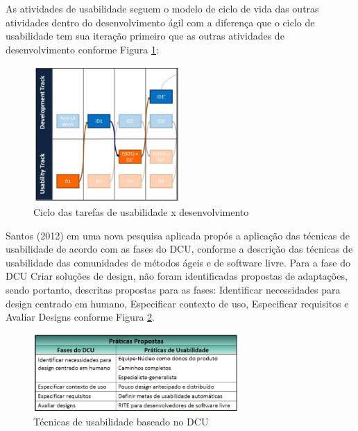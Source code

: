 \documentclass[12pt]{article}
\begin{document}
%
As atividades de usabilidade seguem o modelo de ciclo de vida das outras atividades dentro do desenvolvimento ágil com a diferença que o ciclo de usabilidade tem sua iteração primeiro que as outras atividades de desenvolvimento conforme Figura \ref{fig:figuraCDR2}:

\begin{figure}[H]
  \begin{center}
    \includegraphics[width=0.5\textwidth]{figure/figuraCDR2.png}
    \caption{Ciclo das tarefas de usabilidade x desenvolvimento}
    \label{fig:figuraCDR2}
  \end{center}
\end{figure}

%
Santos (2012) em uma nova pesquisa aplicada propós a aplicação das técnicas de usabilidade de acordo com as fases do DCU, conforme a descrição das técnicas de usabilidade das comunidades de métodos ágeis e de software livre. Para a fase do DCU Criar soluções de design, não foram identificadas propostas de adaptações, sendo portanto, descritas propostas para as fases: Identificar necessidades para design centrado em humano, Especificar contexto de uso, Especificar requisitos e Avaliar Designs conforme Figura \ref{fig:figuraDCU}.

\begin{figure}[H]
  \begin{center}
    \includegraphics[width=0.7\textwidth]{figure/figuraDCU.png}
    \caption{Técnicas de usabilidade baseado no DCU}
    \label{fig:figuraDCU}
  \end{center}
\end{figure}
\end{document}

